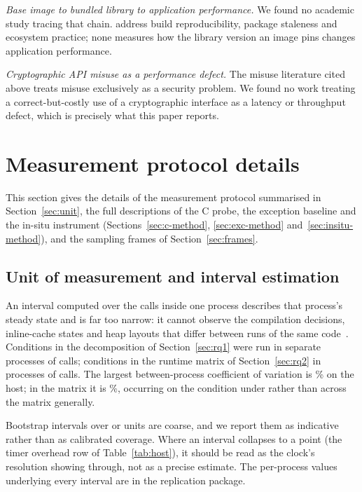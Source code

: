 \documentclass[preprint,12pt,authoryear]{elsarticle}
\begin{document}
\emph{Base image to bundled library to application performance.} We found no
academic study tracing that chain. \citet{malka2026docker} address
build reproducibility, \citet{zerouali2019outdated} package
staleness and \citet{cito2017empirical} ecosystem practice; none
measures how the library version an image pins changes application
performance.

\emph{Cryptographic API misuse as a performance defect.} The misuse literature
cited above treats misuse exclusively as a security problem. We found no work
treating a correct-but-costly use of a cryptographic interface as a latency or
throughput defect, which is precisely what this paper reports.

\section{Measurement protocol details}

This section gives the details of the measurement protocol summarised in
Section~\ref{sec:unit}, the full descriptions of the C probe, the exception
baseline and the in-situ instrument (Sections~\ref{sec:c-method},
\ref{sec:exc-method} and~\ref{sec:insitu-method}), and the sampling frames of
Section~\ref{sec:frames}.

\subsection{Unit of measurement and interval estimation}

An interval computed over the calls inside one process describes that process's
steady state and is far too narrow: it cannot observe the compilation decisions,
inline-cache states and heap layouts that differ between runs of the same
code~\citep{georges2007statistically}. Conditions in the decomposition of
Section~\ref{sec:rq1} were run in \HostInvocations{} separate processes of
\HostCallsPerInvocation{} calls; conditions in the runtime matrix of
Section~\ref{sec:rq2} in \MatrixInvocations{} processes of
\MatrixCallsPerInvocation{} calls. The largest between-process coefficient of
variation is \HostCvMax\% on the host; in the matrix it is \MatrixCvMax\%,
occurring on the \texttt{\MatrixCvMaxCondition} condition under
\texttt{\MatrixCvMaxEnvironment} rather than across the matrix generally.

Bootstrap intervals over \HostInvocations{} or \MatrixInvocations{} units are
coarse, and we report them as indicative rather than as calibrated coverage.
Where an interval collapses to a point (the timer overhead row of
Table~\ref{tab:host}), it should be read as the clock's resolution showing
through, not as a precise estimate. The per-process values underlying every
interval are in the replication package.
\end{document}

